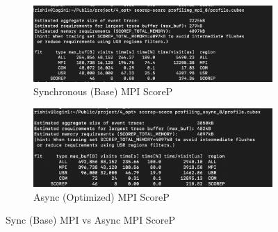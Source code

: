 \documentclass[a4paper,10pt]{article}
\begin{document}
\begin{figure}[b]
     \centering
     \begin{subfigure}[b]{0.45\textwidth}
         \centering
         \includegraphics[width=\textwidth]{../images/4_opt/scorep_8_mpi.png}
         \caption{Synchronous (Base) MPI ScoreP}
         \label{fig:4_opt_scorep_sync}
     \end{subfigure}
     \hfill
     \begin{subfigure}[b]{0.45\textwidth}
         \centering
         \includegraphics[width=\textwidth]{../images/4_opt/scorep_8_async.png}
         \caption{Async (Optimized) MPI ScoreP}
         \label{fig:4_opt_scorep_async}
     \end{subfigure}
     \caption{Sync (Base) MPI vs Async MPI ScoreP}
\end{figure}
\end{document}
